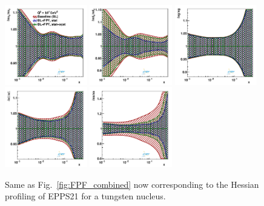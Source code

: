 \begin{figure}[t]
\centering
\includegraphics[width=0.32\textwidth]{plots/nuclear_fasernu2/FPF/fred05fcorr05_FPF_q2_10000_pdf_uv_ratio.pdf}
\includegraphics[width=0.32\textwidth]{plots/nuclear_fasernu2/FPF/fred05fcorr05_FPF_q2_10000_pdf_dv_ratio.pdf}
\includegraphics[width=0.32\textwidth]{plots/nuclear_fasernu2/FPF/fred05fcorr05_FPF_q2_10000_pdf_g_ratio.pdf}\\
\includegraphics[width=0.32\textwidth]{plots/nuclear_fasernu2/FPF/fred05fcorr05_FPF_q2_10000_pdf_Sea_ratio.pdf}
\includegraphics[width=0.32\textwidth]{plots/nuclear_fasernu2/FPF/fred05fcorr05_FPF_q2_10000_pdf_s_ratio.pdf}
\caption{Same as Fig.~\ref{fig:FPF_combined} now corresponding to the Hessian
 profiling of EPPS21 for a tungsten nucleus.
}
\label{fig:profiling_FPF_nuclear}
\end{figure}

